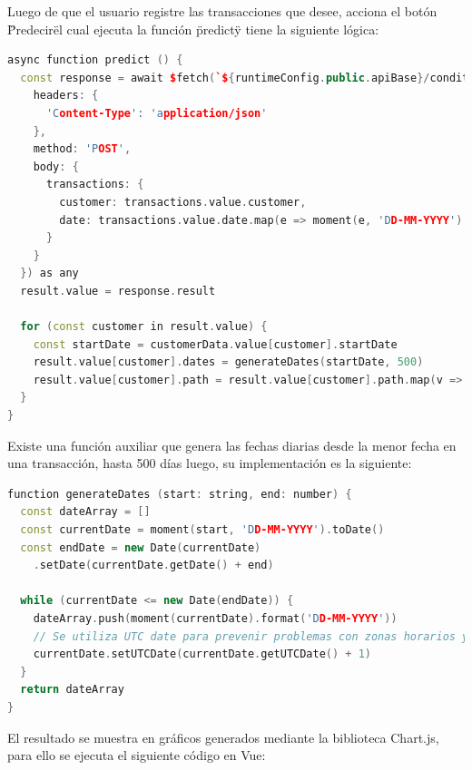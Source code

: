 Luego de que el usuario registre las transacciones que desee, acciona el botón \"Predecir\" el cual ejecuta la función \"predict\" y tiene la siguiente lógica:

\begin{lstlisting}[language=C++, caption=predict en index.vue]
async function predict () {
  const response = await $fetch(`${runtimeConfig.public.apiBase}/conditional-probability-alive`, {
    headers: {
      'Content-Type': 'application/json'
    },
    method: 'POST',
    body: {
      transactions: {
        customer: transactions.value.customer,
        date: transactions.value.date.map(e => moment(e, 'DD-MM-YYYY').format('MM/DD/YYYY'))
      }
    }
  }) as any
  result.value = response.result

  for (const customer in result.value) {
    const startDate = customerData.value[customer].startDate
    result.value[customer].dates = generateDates(startDate, 500)
    result.value[customer].path = result.value[customer].path.map(v => Math.floor((1 - v) * 1000) / 10)
  }
}
\end{lstlisting}	

Existe una función auxiliar que genera las fechas diarias desde la menor fecha en una transacción, hasta 500 días luego, su implementación es la siguiente:

\begin{lstlisting}[language=C++, caption=generateDates en index.vue]
function generateDates (start: string, end: number) {
  const dateArray = []
  const currentDate = moment(start, 'DD-MM-YYYY').toDate()
  const endDate = new Date(currentDate)
  	.setDate(currentDate.getDate() + end)

  while (currentDate <= new Date(endDate)) {
    dateArray.push(moment(currentDate).format('DD-MM-YYYY'))
    // Se utiliza UTC date para prevenir problemas con zonas horarios y DST
    currentDate.setUTCDate(currentDate.getUTCDate() + 1)
  }
  return dateArray
}
\end{lstlisting}	

El resultado se muestra en gráficos generados mediante la biblioteca Chart.js, para ello se ejecuta el siguiente código en Vue:

